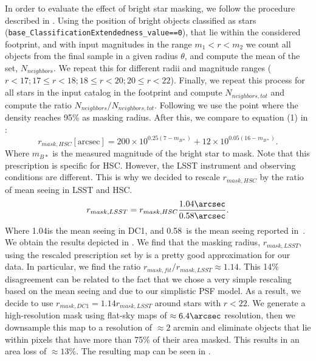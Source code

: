 \documentclass[\docopts]{\docclass}
\begin{document}
In order to evaluate the effect of bright star masking, we follow the procedure described in \citet{2018PASJ...70S...7C}. Using the position of bright objects classified as stars (\texttt{base\_ClassificationExtendedness\_value==0}), that lie within the considered footprint, and with input magnitudes in the range $m_{1} < r < m_{2}$ we count all objects from the final sample in a given radius $\theta$, and compute the mean of the set, $N_{neighbors}$. We repeat this for different radii and magnitude ranges ($ r < 17; 17 \leq r < 18; 18 \leq r < 20; 20 \leq r < 22$). Finally, we repeat this process for all stars in the input catalog in the footprint and compute $N_{neighbors, tot}$ and compute the ratio $N_{neighbors}/N_{neighbors, tot}$. Following \citet{2018PASJ...70S...7C} we use the point where the density reaches 95\% as masking radius. After this, we compare to equation (1) in \citet{2018PASJ...70S..25M}:
\begin{equation}
r_{mask,HSC} [\mathrm{arcsec}]= 200\times 10^{0.25(7-m_{B*})} + 12 \times 10^{0.05(16-m_{B*})}.
\end{equation}
Where $m_{B*}$ is the measured magnitude of the bright star to mask. Note that this prescription is specific for HSC. However, the LSST instrument and observing conditions are different. This is why we decided to rescale $r_{mask,HSC}$ by the ratio of mean seeing in LSST and HSC.
\begin{equation}
r_{mask,LSST} = r_{mask,HSC} \frac{1.04\arcsec}{0.58\arcsec}.
\end{equation}
Where 1.04\arcsec is the mean seeing in DC1, and 0.58\arcsec~is the mean seeing reported in~\citet{2018PASJ...70S..25M}. We obtain the results depicted in . We find that the masking radius, $r_{mask,LSST}$, using the rescaled prescription set by \citet{2018PASJ...70S..25M} is a pretty good approximation for our data. In particular, we find the ratio $r_{mask,fit}/r_{mask,LSST} \approx 1.14$. This 14\% disagreement can be related to the fact that we chose a very simple rescaling based on the mean seeing and due to our simplistic PSF model. As a result, we decide to use $r_{mask, DC1} = 1.14 r_{mask, LSST}$ around stars with $r < 22$. We generate a high-resolution mask using flat-sky maps of $\approx 6.4 \arcsec$ resolution, then we downsample this map to a resolution of $\approx 2$ arcmin and eliminate objects that lie within pixels that have more than 75\% of their area masked. This results in an area loss of $\approx 13\%$. The resulting map can be seen in . 
\end{document}
